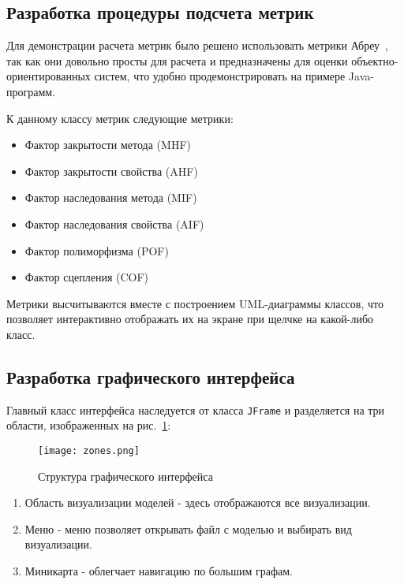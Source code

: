 \subsection{Разработка процедуры подсчета метрик}

Для демонстрации расчета метрик было решено использовать метрики
Абреу~\cite{Abreu1998}, так как они довольно просты для расчета и предназначены
для оценки объектно-ориентированных систем, что удобно продемонстрировать на
примере Java-программ.

К данному классу метрик следующие метрики:

\begin{itemize}
    \item Фактор закрытости метода (MHF)
    \item Фактор закрытости свойства (AHF)
    \item Фактор наследования метода (MIF)
    \item Фактор наследования свойства (AIF)
    \item Фактор полиморфизма (POF)
    \item Фактор сцепления (COF)
\end{itemize}

Метрики высчитываются вместе с построением UML-диаграммы классов, что позволяет
интерактивно отображать их на экране при щелчке на какой-либо класс.

\subsection{Разработка графического интерфейса}

Главный класс интерфейса наследуется от класса \texttt{JFrame} и разделяется на
три области, изображенных на рис.~\ref{fig:zones}:

\begin{figure}[htb]
    \begin{center}
        \texttt{[image: zones.png]}
    \end{center}
    \caption{Структура графического интерфейса}
    \label{fig:zones}
\end{figure}

\begin{enumerate}
    \item Область визуализации моделей - здесь отображаются все визуализации.
    \item Меню - меню позволяет открывать файл с моделью и выбирать вид
    визуализации.
    \item Миникарта - облегчает навигацию по большим графам.
\end{enumerate}


